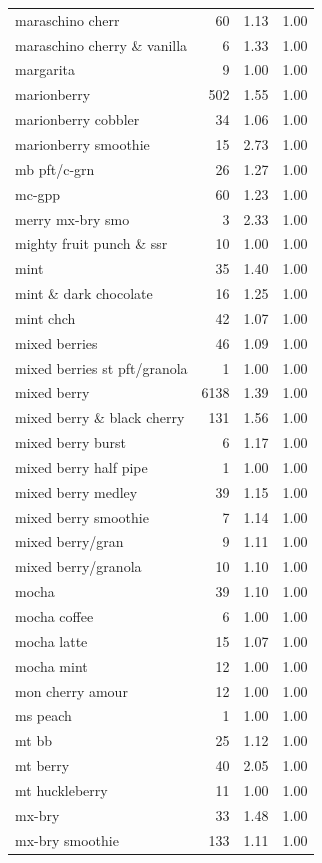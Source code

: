 \begin{table}
\begin{tabular}{lrrr}
maraschino cherr & 60 & 1.13 & 1.00 \\
maraschino cherry \& vanilla & 6 & 1.33 & 1.00 \\
margarita & 9 & 1.00 & 1.00 \\
marionberry & 502 & 1.55 & 1.00 \\
marionberry cobbler & 34 & 1.06 & 1.00 \\
marionberry smoothie & 15 & 2.73 & 1.00 \\
mb pft/c-grn & 26 & 1.27 & 1.00 \\
mc-gpp & 60 & 1.23 & 1.00 \\
merry mx-bry smo & 3 & 2.33 & 1.00 \\
mighty fruit punch \& ssr & 10 & 1.00 & 1.00 \\
mint & 35 & 1.40 & 1.00 \\
mint \& dark chocolate & 16 & 1.25 & 1.00 \\
mint chch & 42 & 1.07 & 1.00 \\
mixed berries & 46 & 1.09 & 1.00 \\
mixed berries st pft/granola & 1 & 1.00 & 1.00 \\
mixed berry & 6138 & 1.39 & 1.00 \\
mixed berry \& black cherry & 131 & 1.56 & 1.00 \\
mixed berry burst & 6 & 1.17 & 1.00 \\
mixed berry half pipe & 1 & 1.00 & 1.00 \\
mixed berry medley & 39 & 1.15 & 1.00 \\
mixed berry smoothie & 7 & 1.14 & 1.00 \\
mixed berry/gran & 9 & 1.11 & 1.00 \\
mixed berry/granola & 10 & 1.10 & 1.00 \\
mocha & 39 & 1.10 & 1.00 \\
mocha coffee & 6 & 1.00 & 1.00 \\
mocha latte & 15 & 1.07 & 1.00 \\
mocha mint & 12 & 1.00 & 1.00 \\
mon cherry amour & 12 & 1.00 & 1.00 \\
ms peach & 1 & 1.00 & 1.00 \\
mt bb & 25 & 1.12 & 1.00 \\
mt berry & 40 & 2.05 & 1.00 \\
mt huckleberry & 11 & 1.00 & 1.00 \\
mx-bry & 33 & 1.48 & 1.00 \\
mx-bry smoothie & 133 & 1.11 & 1.00 \\

\end{tabular}
\end{table}
